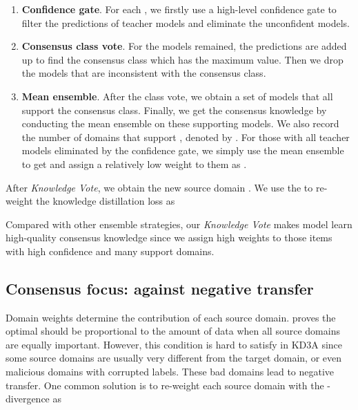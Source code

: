 \documentclass{article}
\begin{document}
\begin{enumerate}
    \item \textbf{Confidence gate}. For each , we firstly use a high-level confidence gate to filter the predictions  of teacher models and eliminate the unconfident models.
    \item \textbf{Consensus class vote}. For the models remained, the predictions are added up to find the consensus class which has the maximum value. Then we drop the models that are inconsistent with the consensus class.
    \item \textbf{Mean ensemble}. After the class vote, we obtain a set of models that all support the consensus class. Finally, we get the consensus knowledge  by conducting the mean ensemble on these supporting models. We also record the number of domains that support , denoted by . For those  with all teacher models eliminated by the confidence gate, we simply use the mean ensemble to get  and assign a relatively low weight to them as . 
\end{enumerate}
After \textit{Knowledge Vote}, we obtain the new source domain . We use the  to re-weight the knowledge distillation loss as  


Compared with other ensemble strategies, our \textit{Knowledge Vote} makes model learn high-quality consensus knowledge since we assign high weights to those items with high confidence and many support domains. 
\subsection{Consensus focus: against negative transfer}
Domain weights  determine the contribution of each source domain. \citet{DBLP:journals/ml/Ben-DavidBCKPV10} proves the optimal  should be proportional to the amount of data when all source domains are 
equally important. However, this condition is hard to satisfy in KD3A since some source domains are usually very different from the target domain, or even malicious domains with corrupted labels. These bad domains lead to negative transfer. One common solution \citep{DBLP:conf/aaai/ZhaoWZGLS0HCK20} is to re-weight each source domain with the -divergence as 
\end{document}

